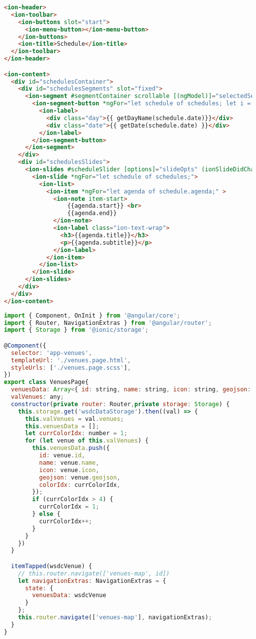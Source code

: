 \begin{lstlisting}[language=html, label={lst:schedule.page.html}, caption=schedule.page.html]
<ion-header>
  <ion-toolbar>
    <ion-buttons slot="start">
      <ion-menu-button></ion-menu-button>
    </ion-buttons>
    <ion-title>Schedule</ion-title>
  </ion-toolbar>
</ion-header>

<ion-content>
  <div id="schedulesContainer">
    <div id="schedulesSegments" slot="fixed">
      <ion-segment #segmentContainer scrollable [(ngModel)]="selectedSegmentIdx"  (ionChange)="onSegmentChanged($event)"> 
        <ion-segment-button *ngFor="let schedule of schedules; let i = index;" [value]="i" [id]="i">
          <ion-label>
            <div class="day">{{ getDayName(schedule.date)}}</div>
            <div class="date">{{ getDate(schedule.date) }}</div>
          </ion-label>
        </ion-segment-button>
      </ion-segment>
    </div>
    <div id="schedulesSlides">
      <ion-slides #scheduleSlider [options]="slideOpts" (ionSlideDidChange)="onSlideChanged()">
        <ion-slide *ngFor="let schedule of schedules;">
          <ion-list>
            <ion-item *ngFor="let agenda of schedule.agenda;" >
              <ion-note item-start>
                  {{agenda.start}} <br> 
                  {{agenda.end}}
              </ion-note>
              <ion-label class="ion-text-wrap">
                <h3>{{agenda.title}}</h3>
                <p>{{agenda.subtitle}}</p>
              </ion-label>
            </ion-item>
          </ion-list>
        </ion-slide>
      </ion-slides>
    </div>
  </div>
</ion-content>

\end{lstlisting}

\begin{lstlisting}[language=JavaScript, label={lst:venues.page.ts}, caption=venues.page.ts]
import { Component, OnInit } from '@angular/core';
import { Router, NavigationExtras } from '@angular/router';
import { Storage } from '@ionic/storage';

@Component({
  selector: 'app-venues',
  templateUrl: './venues.page.html',
  styleUrls: ['./venues.page.scss'],
})
export class VenuesPage{
  venuesData: Array<{ id: string, name: string, icon: string, geojson: any, colorIdx: number }>;
  valVenues: any;
  constructor(private router: Router,private storage: Storage) {
    this.storage.get('wsdcDataStorage').then((val) => {
      this.valVenues = val.venues;
      this.venuesData = [];
      let currColorIdx: number = 1;
      for (let venue of this.valVenues) {
        this.venuesData.push({
          id: venue.id,
          name: venue.name,
          icon: venue.icon,
          geojson: venue.geojson,
          colorIdx: currColorIdx,
        });
        if (currColorIdx > 4) {
          currColorIdx = 1;
        } else {
          currColorIdx++;
        }
      }
    })
  }

  itemTapped(wsdcVenue) {
    // this.router.navigate(['venues-map', id])
    let navigationExtras: NavigationExtras = {
      state: {
        venuesData: wsdcVenue
      }
    };
    this.router.navigate(['venues-map'], navigationExtras);
  }
}

\end{lstlisting} 

